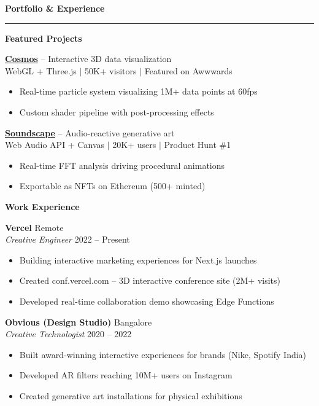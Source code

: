 \documentclass[10pt,letterpaper]{article}
\begin{document}
\hspace{0.9cm}\begin{minipage}[t][0.96\textheight][t]{10.5cm}
\vspace{0.6cm}

{\Large\bfseries\color{sidebar} Portfolio \& Experience}\\[2pt]
{\color{teal}\rule{9cm}{1.5pt}}

\vspace{10pt}
{\color{coral}\bfseries Featured Projects}

\vspace{6pt}
\textbf{\href{https://ankitkumar.dev/cosmos}{Cosmos}} -- Interactive 3D data visualization\\
{\small WebGL + Three.js $\vert$ 50K+ visitors $\vert$ Featured on Awwwards}
\begin{itemize}
\item Real-time particle system visualizing 1M+ data points at 60fps
\item Custom shader pipeline with post-processing effects
\end{itemize}

\vspace{4pt}
\textbf{\href{https://ankitkumar.dev/soundscape}{Soundscape}} -- Audio-reactive generative art\\
{\small Web Audio API + Canvas $\vert$ 20K+ users $\vert$ Product Hunt \#1}
\begin{itemize}
\item Real-time FFT analysis driving procedural animations
\item Exportable as NFTs on Ethereum (500+ minted)
\end{itemize}

\vspace{10pt}
{\color{coral}\bfseries Work Experience}

\vspace{6pt}
\textbf{Vercel} \hfill Remote\\
\textit{Creative Engineer} \hfill 2022 -- Present
\begin{itemize}
\item Building interactive marketing experiences for Next.js launches
\item Created conf.vercel.com -- 3D interactive conference site (2M+ visits)
\item Developed real-time collaboration demo showcasing Edge Functions
\end{itemize}

\vspace{4pt}
\textbf{Obvious (Design Studio)} \hfill Bangalore\\
\textit{Creative Technologist} \hfill 2020 -- 2022
\begin{itemize}
\item Built award-winning interactive experiences for brands (Nike, Spotify India)
\item Developed AR filters reaching 10M+ users on Instagram
\item Created generative art installations for physical exhibitions
\end{itemize}


\end{minipage}
\end{document}
